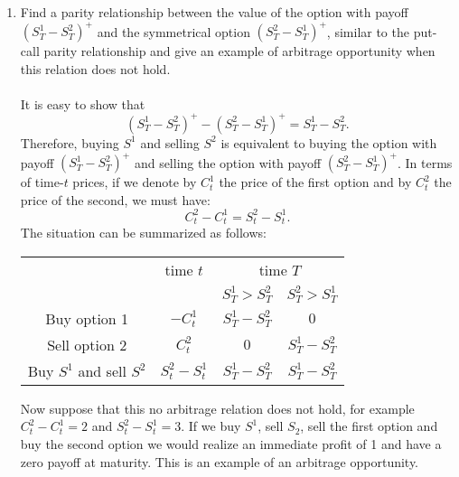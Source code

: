 \documentclass[handout,8pt]{beamer}
\begin{document}
\begin{frame}[allowframebreaks]{ }
\begin{enumerate}
\begin{enumerate}
        \item Find a parity relationship between the value of the option with payoff $(S_T^1-S_T^2)^+$ and the symmetrical option $(S_T^2-S_T^1)^+$, similar to the put-call parity relationship and give an example of arbitrage opportunity when this relation does not hold.\\\\
        It is easy to show that
        \begin{equation*}
            (S_T^1-S_T^2)^+ - (S_T^2-S_T^1)^+ = S_T^1 - S_T^2.
        \end{equation*}
        Therefore, buying $S^1$ and selling $S^2$ is equivalent to buying the option with payoff $(S_T^1 - S_T^2)^+$ and selling the option with payoff $(S_T^2 - S_T^1)^+$. In terms of time-$t$ prices, if we denote by $C_t^1$ the price of the first option and by $C_t^2$ the price of the second, we must have:
        \begin{equation*}
            C_t^2 - C_t^1 = S_t^2 - S_t^1.
        \end{equation*}
        The situation can be summarized as follows:
        \begin{center}
            \begin{tabular}{c | c c c}
            \hline \hline
                   &  time $t$  & \multicolumn{2}{c}{\multirow{1}{*}{time $T$}}  \\
                   & & $S_T^1>S_T^2$ & $S_T^2>S_T^1$\\
            \hline
            Buy option 1   &  $-C_t^1$ & $S_T^1-S_T^2$   & $0$     \\
            Sell option 2  &  $C_t^2$ & $0$  & $S_T^1-S_T^2$    \\
            \hline
            Buy $S^1$ and sell $S^2$ & $S_t^2 - S_t^1$ & $S_T^1-S_T^2$ & $S_T^1-S_T^2$\\
            \hline \hline
            \end{tabular}
        \end{center}
        
        Now suppose that this no arbitrage relation does not hold, for example $C_t^2-C_t^1 = 2$ and $S_t^2-S_t^1  = 3$. If we buy $S^1$, sell $S_2$, sell the first option and buy the second option we would realize an immediate profit of 1 and have a zero payoff at maturity. This is an example of an arbitrage opportunity.
        

\end{enumerate}
\end{enumerate}
\end{frame}
\end{document}
